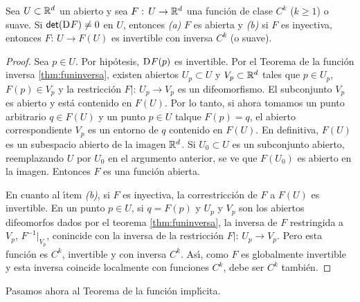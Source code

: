 \begin{coroFunInversa}\label{thm:coroinversa}
	Sea $U\subset\mathbb{R}^{d}$ un abierto y sea $F:\,U\rightarrow\mathbb{R}^{d}$
	una funci\'{o}n de clase $C^{k}$ ($k\geq 1$) o suave. Si
	$\mathsf{det}(\mathrm{D}_{}{F})\not =0$ en $U$, entonces \emph{(a)} $F$ es
	abierta y \emph{(b)} si $F$ es inyectiva, entonces
	$F:\,U\rightarrow F(U)$ es invertible con inversa $C^{k}$ (o suave).
\end{coroFunInversa}

\begin{proof}
	Sea $p\in U$. Por hip\'{o}tesis, $\mathrm{D}_{}{F}(p)$ es invertible.
	Por el Teorema de la funci\'{o}n inversa \ref{thm:funinversa},
	existen abiertos $U_{p}\subset U$ y $V_{p}\subset\mathbb{R}^{d}$ tales
	que $p\in U_{p}$, $F(p)\in V_{p}$ y la restricci\'{o}n
	$F|:\,U_{p}\rightarrow V_{p}$ es un difeomorfismo. El subconjunto
	$V_{p}$ es abierto y est\'{a} contenido en $F(U)$. Por lo tanto,
	si ahora tomamos un punto arbitrario $q\in F(U)$ y un punto $p\in U$
	talque $F(p)=q$, el abierto correspondiente $V_{p}$ es un entorno
	de $q$ contenido en $F(U)$. En definitiva, $F(U)$ es un subespacio
	abierto de la imagen $\mathbb{R}^{d}$. Si $U_{0}\subset U$ es un
	subconjunto abierto, reemplazando $U$ por $U_{0}$ en el argumento
	anterior, se ve que $F(U_{0})$ es abierto en la imagen. Entonces
	$F$ es una funci\'{o}n abierta.

	En cuanto al \'{\i}tem \emph{(b)}, si $F$ es inyectiva, la
	correstricci\'{o}n de $F$ a $F(U)$ es invertible. En un punto
	$p\in U$, si $q=F(p)$ y $U_{p}$ y $V_{p}$ son los abiertos
	difeomorfos dados por el teorema \ref{thm:funinversa}, la
	inversa de $F$ restringida a $V_{p}$, $F^{-1}|_{V_{p}}$, conincide
	con la inversa de la restricci\'{o}n $F|:\,U_{p}\rightarrow V_{p}$.
	Pero esta funci\'{o}n es $C^{k}$, invertible y con inversa $C^{k}$.
	As\'{\i}, como $F$ es globalmente invertible y esta inversa coincide
	localmente con funciones $C^{k}$, debe ser $C^{k}$ tambi\'{e}n.
\end{proof}

Pasamos ahora al Teorema de la funci\'{o}n impl\'{\i}cita.

